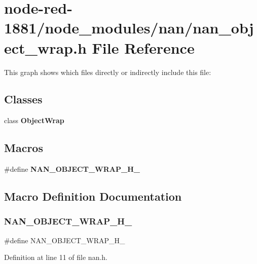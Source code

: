 \section{node-\/red-\/1881/node\+\_\+modules/nan/nan\+\_\+object\+\_\+wrap.h File Reference}
\label{nan__object__wrap_8h}
This graph shows which files directly or indirectly include this file\+:
\subsection*{Classes}
\begin{DoxyCompactItemize}
\item 
class \textbf{ Object\+Wrap}
\end{DoxyCompactItemize}
\subsection*{Macros}
\begin{DoxyCompactItemize}
\item 
\#define \textbf{ N\+A\+N\+\_\+\+O\+B\+J\+E\+C\+T\+\_\+\+W\+R\+A\+P\+\_\+\+H\+\_\+}
\end{DoxyCompactItemize}


\subsection{Macro Definition Documentation}
\mbox{\label{nan_8h_a2cd696f4aca7cf634348fdd42b953f30}} 
\subsubsection{N\+A\+N\+\_\+\+O\+B\+J\+E\+C\+T\+\_\+\+W\+R\+A\+P\+\_\+\+H\+\_\+}
{\footnotesize\ttfamily \#define N\+A\+N\+\_\+\+O\+B\+J\+E\+C\+T\+\_\+\+W\+R\+A\+P\+\_\+\+H\+\_\+}



Definition at line 11 of file nan.\+h.

